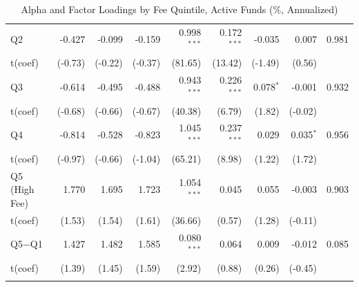 \begin{table}[!htbp]
{\begin{tabular*}{\linewidth}{@{\extracolsep{\fill}}lrrrrrrrr}
\hspace{1em}Q2 & -0.427 & -0.099 & -0.159 & 0.998$^{***}$ & 0.172$^{***}$ & -0.035 & 0.007 & 0.981\\
\hspace{1em}t(coef) & (-0.73) & (-0.22) & (-0.37) & (81.65) & (13.42) & (-1.49) & (0.56) & \\
\hspace{1em}Q3 & -0.614 & -0.495 & -0.488 & 0.943$^{***}$ & 0.226$^{***}$ & 0.078$^{*}$ & -0.001 & 0.932\\
\hspace{1em}t(coef) & (-0.68) & (-0.66) & (-0.67) & (40.38) & (6.79) & (1.82) & (-0.02) & \\
\hspace{1em}Q4 & -0.814 & -0.528 & -0.823 & 1.045$^{***}$ & 0.237$^{***}$ & 0.029 & 0.035$^{*}$ & 0.956\\
\hspace{1em}t(coef) & (-0.97) & (-0.66) & (-1.04) & (65.21) & (8.98) & (1.22) & (1.72) & \\
\hspace{1em}Q5 (High Fee) & 1.770 & 1.695 & 1.723 & 1.054$^{***}$ & 0.045 & 0.055 & -0.003 & 0.903\\
\hspace{1em}t(coef) & (1.53) & (1.54) & (1.61) & (36.66) & (0.57) & (1.28) & (-0.11) & \\
\hspace{1em}Q5$-$Q1 & 1.427 & 1.482 & 1.585 & 0.080$^{***}$ & 0.064 & 0.009 & -0.012 & 0.085\\
\hspace{1em}t(coef) & (1.39) & (1.45) & (1.59) & (2.92) & (0.88) & (0.26) & (-0.45) & \\
\addlinespace[0.3em]
\hline
\bottomrule
\end{tabular*}%
}\sbefit
\fi
\setlength{\tabletempwidth}{\wd\tabletempbox}
\ifdim\tabletempwidth>\linewidth\setlength{\tabletempwidth}{\linewidth}\fi
\begin{minipage}{\tabletempwidth}
\captionsetup{width=\linewidth}
\caption{Alpha and Factor Loadings by Fee Quintile, Active Funds (\%, Annualized)}\label{tab:port_fee_alpha}
\ifdim\wd\tabletempbox>\linewidth
  \resizebox{\linewidth}{!}{\usebox{\tabletempbox}}
\else
  \usebox{\tabletempbox}
\fi
\par\medskip
\begin{singlespace}\tablefont\noindent

\end{singlespace}
\end{minipage}
\end{table}
